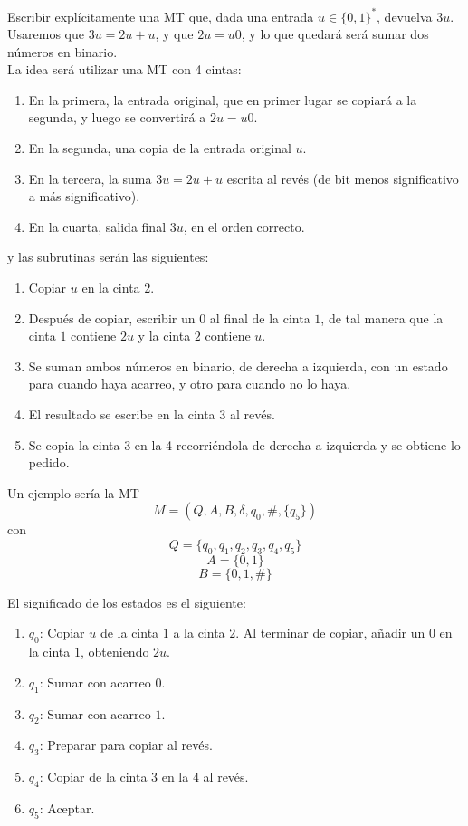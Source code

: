 \documentclass[12pt]{article}
\begin{document}
    \begin{ejercicio}
        Escribir explícitamente una MT que, dada una entrada $u \in \{0,1\}^{*}$,
        devuelva $3u$. \\

        Usaremos que $3u = 2u + u$, y que $2u = u0$, y lo que quedará será
        sumar dos números en binario. \\

        La idea será utilizar una MT con 4 cintas:
        \begin{enumerate}
            \item En la primera, la entrada original, que en primer lugar se copiará a la
            segunda, y luego se convertirá a $2u = u0$.
            \item En la segunda, una copia de la entrada original $u$.
            \item En la tercera, la suma $3u = 2u + u$ escrita al revés (de bit 
            menos significativo a más significativo).
            \item En la cuarta, salida final $3u$, en el orden correcto.
        \end{enumerate}
        y las subrutinas serán las siguientes:
        \begin{enumerate}
            \item Copiar $u$ en la cinta 2.
            \item Después de copiar, escribir un $0$ al final de la cinta $1$,
            de tal manera que la cinta $1$ contiene $2u$ y la cinta $2$ contiene
            $u$.
            \item Se suman ambos números en binario, de derecha a izquierda, con
            un estado para cuando haya acarreo, y otro para cuando no lo haya.
            \item El resultado se escribe en la cinta 3 al revés.
            \item Se copia la cinta 3 en la 4 recorriéndola de derecha 
            a izquierda y se obtiene lo pedido.
        \end{enumerate}


        Un ejemplo sería la MT $$M = (Q,A,B, \delta, q_0, \#, \{q_5\})$$
        con 
        $$Q = \{q_0, q_1, q_2, q_3, q_4, q_5\}$$
        $$A = \{0,1\}$$
        $$B = \{0,1, \#\}$$

        \newpage

        El significado de los estados es el siguiente:
        \begin{enumerate}
            \item $q_0$: Copiar $u$ de la cinta $1$ a la cinta $2$. Al terminar
            de copiar, añadir un $0$ en la cinta $1$, obteniendo $2u$.
            \item $q_1$: Sumar con acarreo $0$.
            \item $q_2$: Sumar con acarreo $1$. 
            \item $q_3$: Preparar para copiar al revés.
            \item $q_4$: Copiar de la cinta $3$ en la $4$ al revés.
            \item $q_5$: Aceptar.
        \end{enumerate}


\end{ejercicio}
\end{document}
